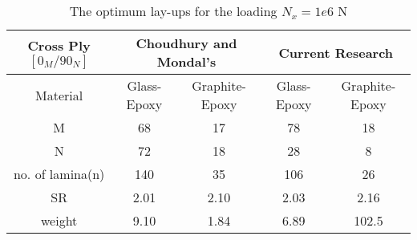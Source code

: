 \begin{table}[!htb]
\caption{The optimum lay-ups for the loading $N_x=1e6$ N}
\centering
\begin{adjustbox}{width=1\textwidth}
\begin{tabular}{c|cc|cc}
	\toprule
	Cross Ply $[0_M/90_N]$         & \multicolumn{2}{c}{Choudhury and Mondal's} & \multicolumn{2}{c}{Current Research} \\
	\midrule																								  
	 Material       &  Glass-Epoxy & Graphite-Epoxy  & Glass-Epoxy & Graphite-Epoxy      \\ 
	      M         &  68          &    17           &  78		    &  18             \\
	      N         &  72          &    18           &  28		    &  8              \\
no. of lamina(n)    &  140         &    35           &  106	    &  26                     \\
         SR         &  2.01        &    2.10         &  2.03	    &  2.16            \\
     weight         &  9.10        &    1.84         &  6.89	    &  102.5           \\
	\bottomrule
\end{tabular}
\end{adjustbox}
\label{tab:comparsion}
\end{table}
